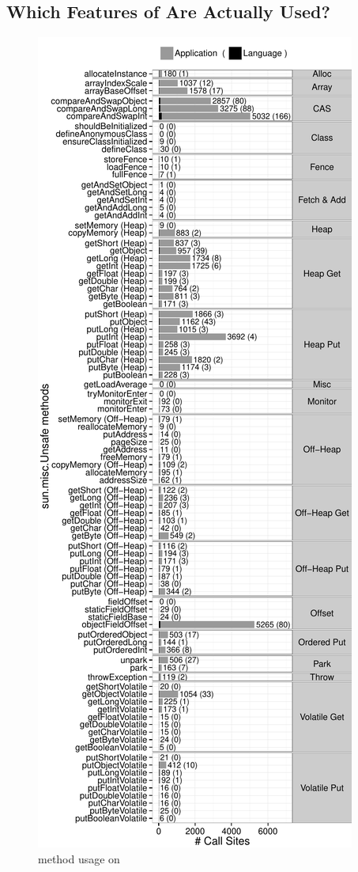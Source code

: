 \subsection*{Which Features of \unsafe{} Are Actually Used?}

\begin{figure}[p]
\centering
\includegraphics[width=0.54\columnwidth]{chapters/unsafe/usage-maven-methods}
\caption{\smu{} method usage on \mavencentral{}}
\label{fig:overview}
\end{figure}

